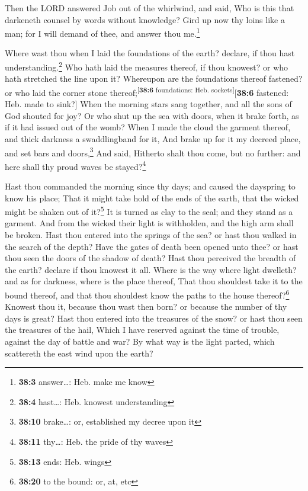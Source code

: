  Then the LORD answered Job out of the whirlwind, and
said,  Who is this that darkeneth counsel by words without
knowledge?  Gird up now thy loins like a man; for I will
demand of thee, and answer thou me.\footnote{\textbf{38:3} answer\ldots:
  Heb. make me know}

 Where wast thou when I laid the foundations of the earth?
declare, if thou hast understanding.\footnote{\textbf{38:4} hast\ldots:
  Heb. knowest understanding}  Who hath laid the measures
thereof, if thou knowest? or who hath stretched the line upon it?
 Whereupon are the foundations thereof fastened? or who
laid the corner stone thereof;\textsuperscript{{[}\textbf{38:6}
foundations: Heb. sockets{]}}{[}\textbf{38:6} fastened: Heb. made to
sink?{]}  When the morning stars sang together, and all
the sons of God shouted for joy?  Or who shut up the sea
with doors, when it brake forth, as if it had issued out of the womb?
 When I made the cloud the garment thereof, and thick
darkness a swaddlingband for it,  And brake up for it my
decreed place, and set bars and doors,\footnote{\textbf{38:10}
  brake\ldots: or, established my decree upon it}  And
said, Hitherto shalt thou come, but no further: and here shall thy proud
waves be stayed?\footnote{\textbf{38:11} thy\ldots: Heb. the pride of
  thy waves}

 Hast thou commanded the morning since thy days; and
caused the dayspring to know his place;  That it might
take hold of the ends of the earth, that the wicked might be shaken out
of it?\footnote{\textbf{38:13} ends: Heb. wings}  It is
turned as clay to the seal; and they stand as a garment. 
And from the wicked their light is withholden, and the high arm shall be
broken.  Hast thou entered into the springs of the sea?
or hast thou walked in the search of the depth?  Have the
gates of death been opened unto thee? or hast thou seen the doors of the
shadow of death?  Hast thou perceived the breadth of the
earth? declare if thou knowest it all.  Where is the way
where light dwelleth? and as for darkness, where is the place thereof,
 That thou shouldest take it to the bound thereof, and
that thou shouldest know the paths to the house thereof?\footnote{\textbf{38:20}
  to the bound: or, at, etc}  Knowest thou it, because
thou wast then born? or because the number of thy days is great?
 Hast thou entered into the treasures of the snow? or
hast thou seen the treasures of the hail,  Which I have
reserved against the time of trouble, against the day of battle and war?
 By what way is the light parted, which scattereth the
east wind upon the earth?

